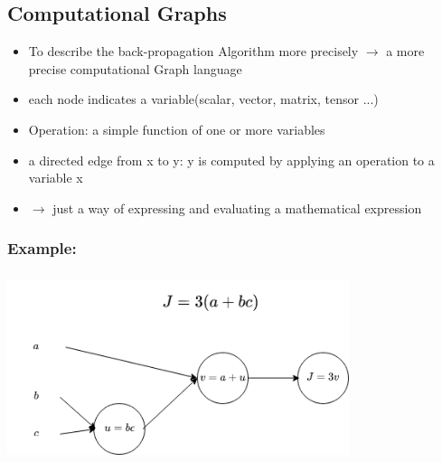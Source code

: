 \documentclass{beamer}
\begin{document}
\subsection{Computational Graphs}
\begin{frame}
	\begin{itemize}
		\item To describe the back-propagation Algorithm more precisely $\rightarrow$ a more precise computational Graph language
		\item each node indicates a variable(scalar, vector, matrix, tensor ...)
		\item Operation: a simple function of one or more variables
		\item a directed edge from x to y: y is computed by applying an operation to a variable x
		\item $\rightarrow$ just a way of expressing and evaluating a mathematical expression
	\end{itemize}
\end{frame}
\begin{frame}
	\frametitle{Example:}
	\center
	\includegraphics[width=100mm, height= 55mm]{comp_graph.png}
	
\end{frame}
\end{document}
